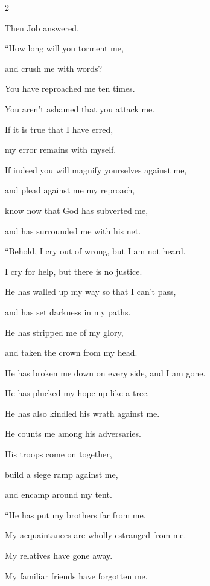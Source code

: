 \begin{multicols}{2}
	
	\mychapter{} \myverse*{}Then Job answered,
	
	\quad\quad \myverse{}“How long will you torment me,
	
	and crush me with words?
	
	\myverse{}You have reproached me ten times.
	
	You aren’t ashamed that you attack me.
	
	\myverse{}If it is true that I have erred,
	
	my error remains with myself.
	
	\myverse{}If indeed you will magnify yourselves against me,
	
	and plead against me my reproach,
	
	\myverse{}know now that God has subverted me,
	
	and has surrounded me with his net.
	
	\vspace{\baselineskip}
	
	\myverse{}“Behold, I cry out of wrong, but I am not heard.
	
	I cry for help, but there is no justice.
	
	\myverse{}He has walled up my way so that I can’t pass,
	
	and has set darkness in my paths.
	
	\myverse{}He has stripped me of my glory,
	
	and taken the crown from my head.
	
	\myverse{}He has broken me down on every side, and I am gone.
	
	He has plucked my hope up like a tree.
	
	\myverse{}He has also kindled his wrath against me.
	
	He counts me among his adversaries.
	
	\myverse{}His troops come on together,
	
	build a siege ramp against me,
	
	and encamp around my tent.
	
	\vspace{\baselineskip}
	
	\myverse{}“He has put my brothers far from me.
	
	My acquaintances are wholly estranged from me.
	
	\myverse{}My relatives have gone away.
	
	My familiar friends have forgotten me.
	

\end{multicols}
